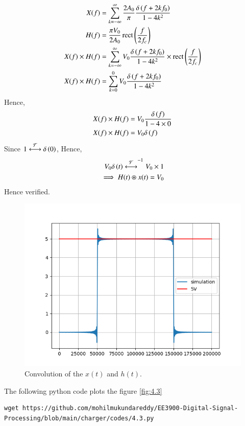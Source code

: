 \documentclass[journal,12pt,twocolumn]{IEEEtran}
\renewcommand\thesection{\arabic{section}}
\begin{document}
\begin{enumerate}[label=\thesection.\arabic*
	,ref=\thesection.\theenumi]
	\begin{align}
		X(f)&=\sum_{k=-\infty}^{\infty} \frac{2A_0}{\pi} \frac{\delta\left(f+2kf_0\right)}{1-4k^2}\\
		H(f)&=\frac{\pi V_0}{2A_0}\mathop{\mathrm{rect}}{\left(\frac{f}{2f_c}\right)}\\
		X(f) \times H(f)&=\sum_{k=-\infty}^{\infty} V_0 \frac{\delta\left(f+2kf_0\right)}{1-4k^2} \times \mathop{\mathrm{rect}}{\left(\frac{f}{2f_c}\right)}\\
		X(f)\times H(f)&=\sum_{k=0}^{0} V_0 \frac{\delta\left(f+2kf_0\right)}{1-4k^2}
	\end{align} 
	Hence,
	\begin{align}
		X(f)\times H(f)&=V_0 \frac{\delta\left(f\right)}{1-4 \times 0}\\
		X(f)\times H(f)&=V_0 \delta\left(f\right)
	\end{align} 
Since $1\overset{\mathcal{F}}{ \longleftrightarrow} \delta\left(0\right)$,
Hence, 
\begin{align}
V_0 \delta\left(t\right) \overset{\mathcal{F}}{ \longleftrightarrow}^{-1} V_0\times 1	\\
\implies H(t) \circledast x(t)=V_0
\end{align}
Hence verified.
	\begin{figure}[!ht]
			\includegraphics[width=\columnwidth]{figs/4.3.png}
			\caption{Convolution of the $x(t)$ and $h(t)$.}
			\label{eq:fig:4.3}
		\end{figure}
The following python code plots the figure \ref{fig:4.3}
\begin{lstlisting}
wget https://github.com/mohilmukundareddy/EE3900-Digital-Signal-Processing/blob/main/charger/codes/4.3.py
\end{lstlisting} 
\end{enumerate}
\end{document}
